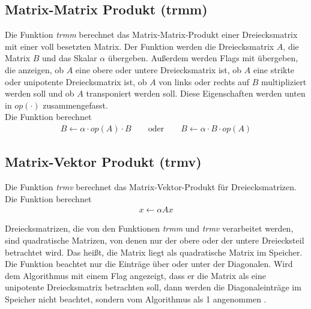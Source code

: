 \subsection{Matrix-Matrix Produkt (trmm)} \label{fkt:trmm}
Die Funktion \textit{trmm} berechnet das Matrix-Matrix-Produkt einer Dreiecksmatrix mit einer voll besetzten Matrix.
Der Funktion werden die Dreiecksmatrix $A$, die Matrix $B$ und das Skalar $\alpha$ übergeben. Außerdem werden Flags mit übergeben, die anzeigen, ob $A$ eine obere oder untere Dreiecksmatrix ist, ob $A$ eine strikte oder unipotente Dreiecksmatrix ist, ob $A$ von links oder rechts auf $B$ multipliziert werden soll und ob $A$ transponiert werden soll. Diese Eigenschaften werden unten in $op(\cdot)$ zusammengefasst. \\
Die Funktion berechnet
\begin{align}
B \leftarrow  \alpha \cdot op(A) \cdot B \qquad \text{oder} \qquad B \leftarrow  \alpha \cdot B \cdot op(A)
\end{align}
\subsection{Matrix-Vektor Produkt (trmv)} \label{fkt:trmv}
Die Funktion \textit{trmv} berechnet das Matrix-Vektor-Produkt für Dreiecksmatrizen.
Die Funktion berechnet
\begin{align}
x \leftarrow \alpha  Ax %
\end{align}


Dreiecksmatrizen, die von den Funktionen \textit{trmm} und \textit{trmv} verarbeitet werden, sind quadratische Matrizen, von denen nur der obere oder der untere Dreiecksteil betrachtet wird.
Das heißt, die Matrix liegt als quadratische Matrix im Speicher. Die Funktion beachtet nur die Einträge über oder unter der Diagonalen.
Wird dem Algorithmus mit einem Flag angezeigt, dass 
er die Matrix als eine unipotente Dreiecksmatrix betrachten soll,
dann werden die Diagonaleinträge im Speicher nicht beachtet, sondern vom Algorithmus als 1 angenommen \cite{blast}.


